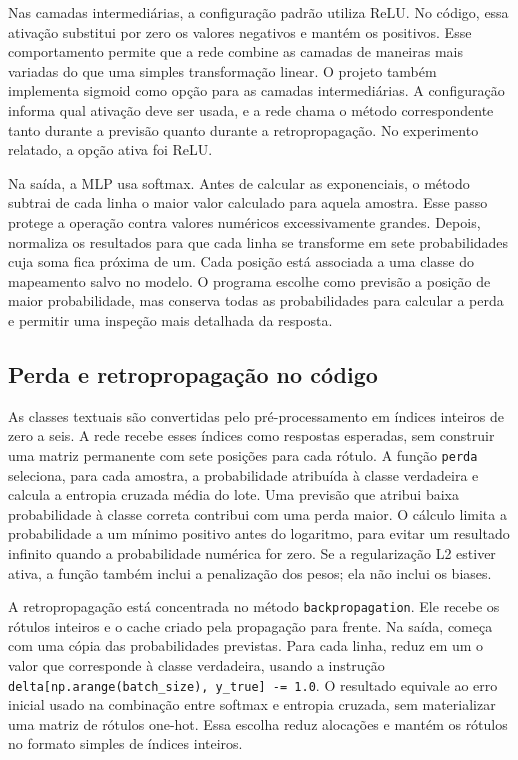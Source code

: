 \documentclass[12pt]{article}
\begin{document}
Nas camadas intermediárias, a configuração padrão utiliza ReLU. No código, essa ativação substitui por zero os valores negativos e mantém os positivos. Esse comportamento permite que a rede combine as camadas de maneiras mais variadas do que uma simples transformação linear. O projeto também implementa sigmoid como opção para as camadas intermediárias. A configuração informa qual ativação deve ser usada, e a rede chama o método correspondente tanto durante a previsão quanto durante a retropropagação. No experimento relatado, a opção ativa foi ReLU.

Na saída, a MLP usa softmax. Antes de calcular as exponenciais, o método subtrai de cada linha o maior valor calculado para aquela amostra. Esse passo protege a operação contra valores numéricos excessivamente grandes. Depois, normaliza os resultados para que cada linha se transforme em sete probabilidades cuja soma fica próxima de um. Cada posição está associada a uma classe do mapeamento salvo no modelo. O programa escolhe como previsão a posição de maior probabilidade, mas conserva todas as probabilidades para calcular a perda e permitir uma inspeção mais detalhada da resposta.

\subsection{Perda e retropropagação no código}

As classes textuais são convertidas pelo pré-processamento em índices inteiros de zero a seis. A rede recebe esses índices como respostas esperadas, sem construir uma matriz permanente com sete posições para cada rótulo. A função \texttt{perda} seleciona, para cada amostra, a probabilidade atribuída à classe verdadeira e calcula a entropia cruzada média do lote. Uma previsão que atribui baixa probabilidade à classe correta contribui com uma perda maior. O cálculo limita a probabilidade a um mínimo positivo antes do logaritmo, para evitar um resultado infinito quando a probabilidade numérica for zero. Se a regularização L2 estiver ativa, a função também inclui a penalização dos pesos; ela não inclui os biases.

A retropropagação está concentrada no método \texttt{backpropagation}. Ele recebe os rótulos inteiros e o cache criado pela propagação para frente. Na saída, começa com uma cópia das probabilidades previstas. Para cada linha, reduz em um o valor que corresponde à classe verdadeira, usando a instrução \texttt{delta[np.arange(batch\_size), y\_true] -= 1.0}. O resultado equivale ao erro inicial usado na combinação entre softmax e entropia cruzada, sem materializar uma matriz de rótulos one-hot. Essa escolha reduz alocações e mantém os rótulos no formato simples de índices inteiros.
\end{document}
